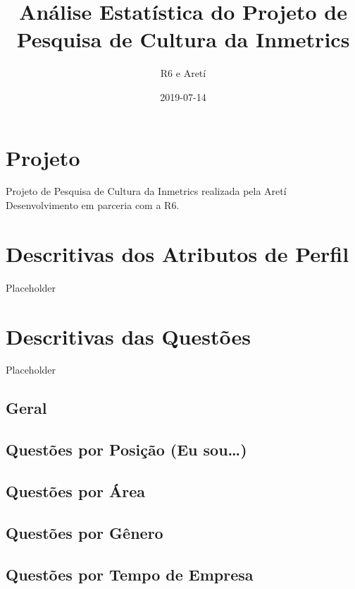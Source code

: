 \documentclass[]{book}
\title{Análise Estatística do Projeto de Pesquisa de Cultura da Inmetrics}
\author{R6 e Aretí}
\date{2019-07-14}
\begin{document}
\maketitle

{
\setcounter{tocdepth}{1}
\tableofcontents
}
\hypertarget{projeto}{%
\chapter{Projeto}\label{projeto}}

Projeto de Pesquisa de Cultura da Inmetrics realizada pela Aretí Desenvolvimento em parceria com a R6.

\hypertarget{descritivas-dos-atributos-de-perfil}{%
\chapter{Descritivas dos Atributos de Perfil}\label{descritivas-dos-atributos-de-perfil}}

Placeholder

\hypertarget{descritivas-das-questoes}{%
\chapter{Descritivas das Questões}\label{descritivas-das-questoes}}

Placeholder

\hypertarget{geral}{%
\section{Geral}\label{geral}}

\hypertarget{questoes-por-posicao-eu-sou}{%
\section{Questões por Posição (Eu sou\ldots{})}\label{questoes-por-posicao-eu-sou}}

\hypertarget{questoes-por-area}{%
\section{Questões por Área}\label{questoes-por-area}}

\hypertarget{questoes-por-genero}{%
\section{Questões por Gênero}\label{questoes-por-genero}}

\hypertarget{questoes-por-tempo-de-empresa}{%
\section{Questões por Tempo de Empresa}\label{questoes-por-tempo-de-empresa}}
\end{document}
